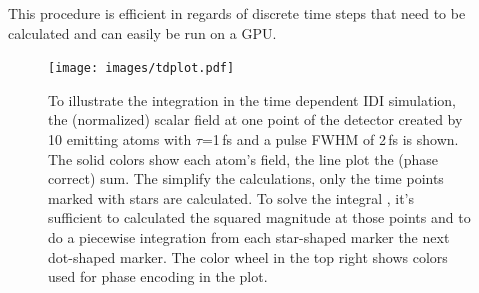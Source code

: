 This procedure is efficient in regards of discrete time steps that need to be calculated and can easily be run on a GPU.


\begin{figure}
	   \centering
		\texttt{[image: images/tdplot.pdf]}


	\caption[Integration in Time Dependent IDI Simulation]{To illustrate the integration in the time dependent IDI simulation, the (normalized) scalar field at one point of the detector created by 10 emitting atoms with $\tau$=1\,fs and a pulse FWHM of 2\,fs is shown. The solid colors show each atom's field, the line plot the (phase correct) sum. The simplify the calculations, only the time points marked with stars are calculated. To solve the integral , it's sufficient to calculated the squared magnitude at those points and to do a piecewise integration from each star-shaped marker the next dot-shaped marker. The color wheel in the top right shows colors used for phase encoding in the plot.}
	\label{fig:tdplot}
\end{figure}


